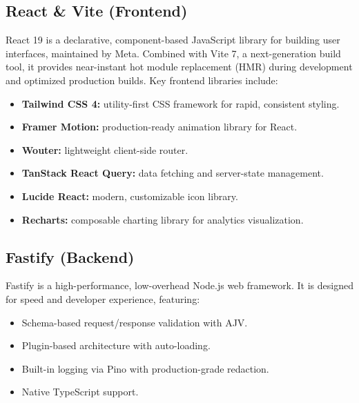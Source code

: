 \subsection{React \& Vite (Frontend)}


React 19 is a declarative, component-based JavaScript library for building user interfaces, maintained by Meta. Combined with Vite 7, a next-generation build tool, it provides near-instant hot module replacement (HMR) during development and optimized production builds. Key frontend libraries include:

\begin{itemize}
    \item \textbf{Tailwind CSS 4:} utility-first CSS framework for rapid, consistent styling.
    \item \textbf{Framer Motion:} production-ready animation library for React.
    \item \textbf{Wouter:} lightweight client-side router.
    \item \textbf{TanStack React Query:} data fetching and server-state management.
    \item \textbf{Lucide React:} modern, customizable icon library.
    \item \textbf{Recharts:} composable charting library for analytics visualization.
\end{itemize}

\subsection{Fastify (Backend)}

Fastify is a high-performance, low-overhead Node.js web framework. It is designed for speed and developer experience, featuring:

\begin{itemize}
    \item Schema-based request/response validation with AJV.
    \item Plugin-based architecture with auto-loading.
    \item Built-in logging via Pino with production-grade redaction.
    \item Native TypeScript support.
\end{itemize}

